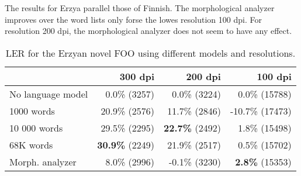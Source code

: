 \documentclass[b5paper]{article}
\begin{document}
The results for Erzya parallel those of Finnish. The morphological analyzer improves over the word lists only forse the lowes resolution 100 dpi. For resolution 200 dpi, the morphological analyzer does not seem to have any effect.


\begin{table}[!htb]
\begin{center}
\begin{tabular}{lrrr}
\hline 
                  & 300 dpi & 200 dpi & 100 dpi \\
\hline 
No language model &  0.0\% (3257)  &  0.0\% (3224)  &  0.0\% (15788)  \\
1000 words        &  20.9\% (2576)  &  11.7\% (2846)  & -10.7\%  (17473) \\
10 000 words      &  29.5\% (2295)  &   {\bf 22.7\%} (2492)  & 1.8\% (15498)  \\
68K words         &  {\bf 30.9\%} (2249)  &  21.9\% (2517)  & 0.5\% (15702)\\
Morph. analyzer   &  8.0\% (2996)  &  -0.1\% (3230)  & {\bf 2.8\%} (15353)  \\
\hline 
\end{tabular}
\caption{LER for the Erzyan novel FOO using different models and resolutions.}\label{fin-news-res}
\end{center}
\end{table}
\end{document}
